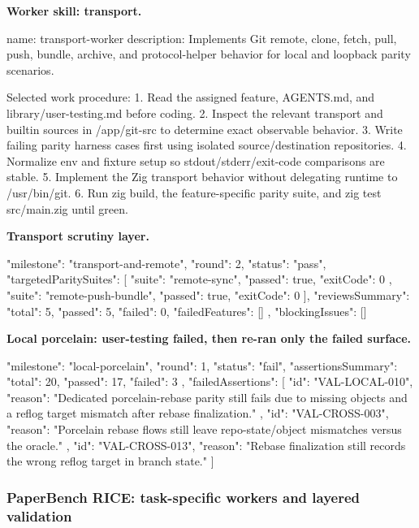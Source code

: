 \documentclass[11pt,a4paper]{article}
\begin{document}
\textbf{Worker skill: transport.}

\begin{cbox}
name: transport-worker
description: Implements Git remote, clone, fetch, pull, push, bundle, archive,
  and protocol-helper behavior for local and loopback parity scenarios.

Selected work procedure:
1. Read the assigned feature, AGENTS.md, and library/user-testing.md before coding.
2. Inspect the relevant transport and builtin sources in /app/git-src to determine
   exact observable behavior.
3. Write failing parity harness cases first using isolated source/destination repositories.
4. Normalize env and fixture setup so stdout/stderr/exit-code comparisons are stable.
5. Implement the Zig transport behavior without delegating runtime to /usr/bin/git.
6. Run zig build, the feature-specific parity suite, and zig test src/main.zig until green.
\end{cbox}

\textbf{Transport scrutiny layer.}

\begin{cbox}
{
  "milestone": "transport-and-remote",
  "round": 2,
  "status": "pass",
  "targetedParitySuites": [
    { "suite": "remote-sync",        "passed": true, "exitCode": 0 },
    { "suite": "remote-push-bundle", "passed": true, "exitCode": 0 }
  ],
  "reviewsSummary": { "total": 5, "passed": 5, "failed": 0, "failedFeatures": [] },
  "blockingIssues": []
}
\end{cbox}

\textbf{Local porcelain: user-testing failed, then re-ran only the failed surface.}

\begin{cbox}
{
  "milestone": "local-porcelain",
  "round": 1,
  "status": "fail",
  "assertionsSummary": { "total": 20, "passed": 17, "failed": 3 },
  "failedAssertions": [
    { "id": "VAL-LOCAL-010", "reason": "Dedicated porcelain-rebase parity still fails due to missing objects and a reflog target mismatch after rebase finalization." },
    { "id": "VAL-CROSS-003", "reason": "Porcelain rebase flows still leave repo-state/object mismatches versus the oracle." },
    { "id": "VAL-CROSS-013", "reason": "Rebase finalization still records the wrong reflog target in branch state." }
  ]
}
\end{cbox}

\subsubsection{PaperBench RICE: task-specific workers and layered validation}
\end{document}
